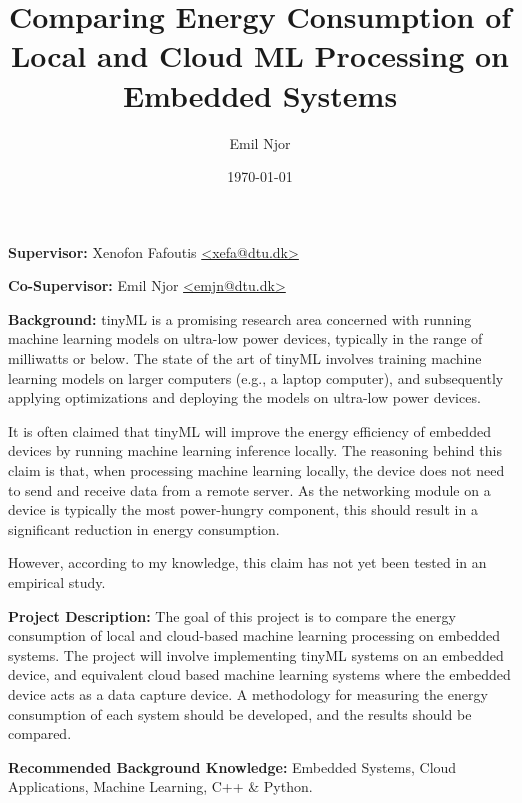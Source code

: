 \documentclass{article}
\author{Emil Njor}
\title{Comparing Energy Consumption of Local and Cloud ML Processing on Embedded Systems}
\date{\today}
\begin{document}
\maketitle
\textbf{Supervisor:} Xenofon Fafoutis \href{mailto:xefa@dtu.dk}{\textless{}xefa@dtu.dk\textgreater}

\textbf{Co-Supervisor:} Emil Njor \href{mailto:emjn@dtu.dk}{\textless{}emjn@dtu.dk\textgreater}

\textbf{Background:} tinyML is a promising research area concerned with running machine learning models on ultra-low power devices, typically in the range of milliwatts or below.
The state of the art of tinyML involves training machine learning models on larger computers (e.g., a laptop computer), and subsequently applying optimizations and deploying the models on ultra-low power devices.

It is often claimed that tinyML will improve the energy efficiency of embedded devices by running machine learning inference locally.
The reasoning behind this claim is that, when processing machine learning locally, the device does not need to send and receive data from a remote server.
As the networking module on a device is typically the most power-hungry component, this should result in a significant reduction in energy consumption.

However, according to my knowledge, this claim has not yet been tested in an empirical study.

\textbf{Project Description:} The goal of this project is to compare the energy consumption of local and cloud-based machine learning processing on embedded systems.
The project will involve implementing tinyML systems on an embedded device, and equivalent cloud based machine learning systems where the embedded device acts as a data capture device.
A methodology for measuring the energy consumption of each system should be developed, and the results should be compared.


\textbf{Recommended Background Knowledge:} Embedded Systems, Cloud Applications, Machine Learning, C++ \& Python.
\end{document}
